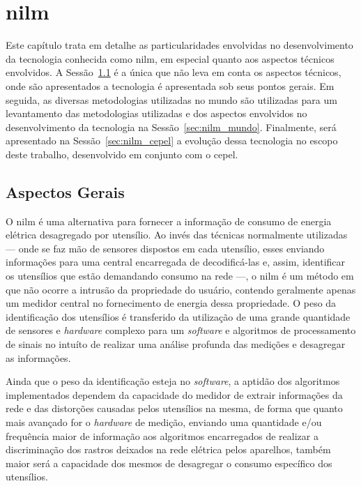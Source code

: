 \chapter[Monitoramento Não-Invasivo de Cargas Elétricas]{\acrfull{nilm}}
\label{cap:nilm}

Este capítulo trata em detalhe as particularidades envolvidas no
desenvolvimento da tecnologia conhecida como \gls{nilm}, em especial
quanto aos aspectos técnicos envolvidos. A
Sessão~\ref{sec:nilm_aspec_gerais} é a única que não leva em conta os
aspectos técnicos, onde são apresentados a tecnologia é apresentada
sob seus pontos gerais. Em seguida, as diversas metodologias utilizadas
no mundo são utilizadas para um levantamento das metodologias
utilizadas e dos aspectos envolvidos no desenvolvimento da tecnologia
na Sessão~\ref{sec:nilm_mundo}. Finalmente, será apresentado na
Sessão~\ref{sec:nilm_cepel} a evolução dessa tecnologia no escopo
deste trabalho, desenvolvido em conjunto com o \gls{cepel}.

\section{Aspectos Gerais}
\label{sec:nilm_aspec_gerais}

O \gls{nilm} é uma alternativa para fornecer a informação de consumo
de energia elétrica desagregado por utensílio. Ao invés das técnicas
normalmente utilizadas --- onde se faz mão de sensores dispostos em cada
utensílio, esses enviando informações para uma central encarregada de
decodificá-las e, assim, identificar os utensílios que estão demandando
consumo na rede ---, o \gls{nilm} é um método em que não ocorre a intrusão
da propriedade do usuário, contendo geralmente apenas um medidor
central no fornecimento de energia dessa propriedade. O peso da
identificação dos utensílios é transferido da utilização de uma grande
quantidade de sensores e \emph{hardware} complexo para um
\emph{software} e algoritmos de processamento de sinais no intuíto de
realizar uma análise profunda das medições e desagregar as
informações.

Ainda que o peso da identificação esteja no \emph{software}, a
aptidão dos algoritmos implementados dependem da capacidade do
medidor de extrair informações da rede e das distorções causadas pelos
utensílios na mesma, de forma que quanto mais avançado for o
\emph{hardware} de medição, enviando uma quantidade e/ou frequência
maior de informação aos algoritmos encarregados de realizar a
discriminação dos rastros deixados na rede elétrica pelos aparelhos,
também maior será a capacidade dos mesmos de desagregar o consumo
específico dos utensílios.

